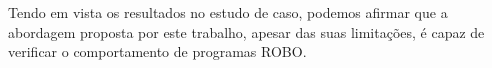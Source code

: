 Tendo em vista os resultados no estudo de caso, podemos afirmar que a abordagem proposta por este trabalho, apesar das suas limitações, é capaz de verificar o comportamento de programas ROBO. 


